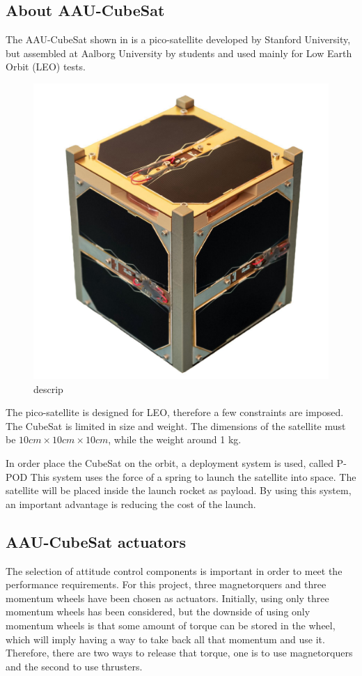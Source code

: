 \subsection{About AAU-CubeSat}
The AAU-CubeSat shown in  is a pico-satellite developed by Stanford University, but assembled at Aalborg University by students and used mainly for Low Earth Orbit (LEO)  tests.
\begin{figure}[H]
	\centering
	\includegraphics[width=0.3\linewidth]{figures/aau_cubsat}
	\caption{descrip}
	\label{fig:pico}
\end{figure}
The pico-satellite is designed for LEO, therefore a few constraints are imposed. The CubeSat is limited in size and weight. The dimensions of the satellite must be $10cm\times10cm\times10cm$, while the weight around 1 kg. 

In order place the CubeSat on the orbit, a deployment system is used, called P-POD  This system uses the force of a spring to launch the satellite into space. The satellite will be placed inside the launch rocket as payload. By using this system, an important advantage is reducing the cost of the launch.
%
\subsection{AAU-CubeSat actuators}
The selection of attitude control components is important in order to meet the performance requirements. For this project, three magnetorquers and three momentum wheels have been chosen as actuators. Initially, using only three momentum wheels has been considered, but the downside of using only momentum wheels is that some amount of torque can be stored in the wheel, which will imply having a way to take back all that momentum and use it. Therefore, there are two ways to release that torque, one is to use magnetorquers and the second to use thrusters. 

